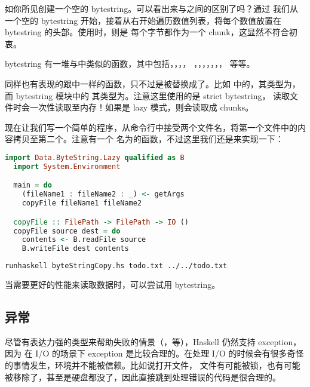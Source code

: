 \documentclass[./main.tex]{subfiles}
\begin{document}
如你所见创建一个空的 bytestring。可以看出来与之间的区别了吗？通过
我们从一个空的 bytestring 开始，接着从右开始遍历数值列表，将每个数值放置在 bytestring 的头部。使用时，则是
每个字节都作为一个 chunk，这显然不符合初衷。

bytestring 有一堆与中类似的函数，其中包括，，，，
，，，，，，，
等等。

同样也有表现的跟中一样的函数，只不过是被替换成了。比如
中的，其类型为，而 bytestring 模块中的
其类型为。注意这里使用的是 strict bytestring，
读取文件时会一次性读取至内存！如果是 lazy 模式，则会读取成 chunks。

现在让我们写一个简单的程序，从命令行中接受两个文件名，将第一个文件中的内容拷贝至第二个。注意有一个
名为的函数，不过这里我们还是来实现一下：

\begin{lstlisting}[language=Haskell]
  import Data.ByteString.Lazy qualified as B
  import System.Environment

  main = do
    (fileName1 : fileName2 : _) <- getArgs
    copyFile fileName1 fileName2

  copyFile :: FilePath -> FilePath -> IO ()
  copyFile source dest = do
    contents <- B.readFile source
    B.writeFile dest contents
\end{lstlisting}

\begin{lstlisting}[language=Bash]
  runhaskell byteStringCopy.hs todo.txt ../../todo.txt
\end{lstlisting}

当需要更好的性能来读取数据时，可以尝试用 bytestring。

\subsection*{异常}

尽管有表达力强的类型来帮助失败的情景（，等），Haskell 仍然支持 exception，因为
在 I/O 的场景下 exception 是比较合理的。在处理 I/O 的时候会有很多奇怪的事情发生，环境并不能被信赖。比如说打开文件，
文件有可能被锁，也有可能被移除了，甚至是硬盘都没了，因此直接跳到处理错误的代码是很合理的。
\end{document}
